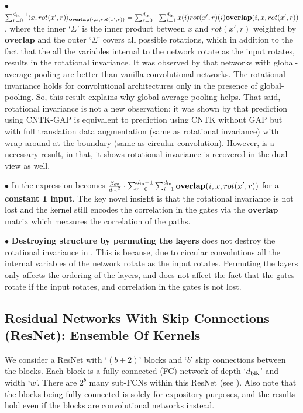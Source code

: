 $\bullet$ $\sum_{r=0}^{d_{\text{in}}-1} \langle x,rot(x',r)\rangle_{\textbf{overlap}(\cdot, x,rot(x',r))}=\sum_{r=0}^{d_{\text{in}}-1}\sum_{i=1}^{d_{\text{in}}} x(i) rot(x',r)(i)\textbf{overlap}(i,x,rot(x',r))$, where the inner `$\Sigma$' is the inner product between $x$ and $rot(x',r)$ weighted by $\textbf{overlap}$ and the outer `$\Sigma$' covers all possible rotations, which in addition to the fact that the all the variables internal to the network rotate as the input rotates, results in the rotational invariance.  It was observed by \cite{arora2019exact} that networks with global-average-pooling are better than vanilla convolutional networks. The rotational invariance holds for convolutional architectures only in the presence of global-pooling.  So, this result explains why global-average-pooling helps. That said, rotational invariance is not a new observation; it was shown by \cite{li2019enhanced} that  prediction using CNTK-GAP is equivalent to prediction using CNTK without GAP but with full translation data augmentation  (same as rotational invariance) with wrap-around at the boundary (same as circular convolution). However,  is a necessary result, in that, it shows rotational invariance is recovered in the dual view as well. 

$\bullet$ In  the expression becomes $\frac{\beta_{\text{cv}}}{{d_{\text{in}}}^2} \cdot \sum_{r=0}^{d_{\text{in}}-1}\sum_{i=1}^{d_{\text{in}}} \textbf{overlap}(i,x,rot(x',r))$ for a  \textbf{constant $\mathbf{1}$ input}. The key novel insight is that the rotational invariance is not lost and the kernel still encodes the correlation in the gates via the $\textbf{overlap}$ matrix which measures the correlation of the paths.

$\bullet$ \textbf{Destroying structure by permuting the layers} does not destroy the rotational invariance in . This is because, due to circular convolutions all the internal variables of the network rotate as the input rotates. Permuting the layers only affects the ordering of the layers, and does not affect the fact that the gates rotate if the input rotates, and correlation in the gates is not lost.

\subsection{Residual Networks With Skip Connections (ResNet): Ensemble Of Kernels}
We consider a ResNet with `$(b+2)$' blocks and `$b$' skip connections between the blocks. Each block is a fully connected (FC) network of depth `$d_{\text{blk}}$' and width `$w$'. There are $2^b$ many sub-FCNs within this ResNet (see ).
Also note that the blocks being fully connected is solely for expository purposes, and the results hold even if the blocks are convolutional networks instead.

